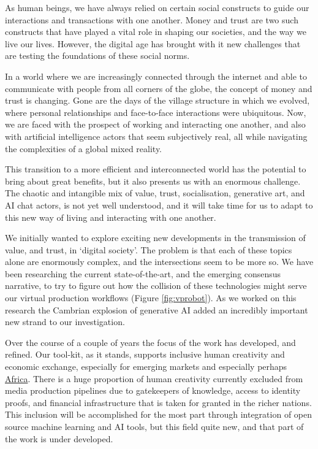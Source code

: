 As human beings, we have always relied on certain social constructs to guide our interactions and transactions with one another. Money and trust are two such constructs that have played a vital role in shaping our societies, and the way we live our lives. However, the digital age has brought with it new challenges that are testing the foundations of these social norms.\par
In a world where we are increasingly connected through the internet and able to communicate with people from all corners of the globe, the concept of money and trust is changing. Gone are the days of the village structure in which we evolved, where personal relationships and face-to-face interactions were ubiquitous. Now, we are faced with the prospect of working and interacting one another, and also with artificial intelligence actors that seem subjectively real, all while navigating the complexities of a global mixed reality.\par
This transition to a more efficient and interconnected world has the potential to bring about great benefits, but it also presents us with an enormous challenge. The chaotic and intangible mix of value, trust, socialisation, generative art, and AI chat actors, is not yet well understood, and it will take time for us to adapt to this new way of living and interacting with one another.\par
We initially wanted to explore exciting new developments in the transmission of value, and trust, in `digital society'. The problem is that each of these topics alone are enormously complex, and the intersections seem to be more so. We have been researching the current state-of-the-art, and the emerging consensus narrative, to try to figure out how the collision of these technologies might serve our virtual production workflows (Figure \ref{fig:vprobot}). As we worked on this research the Cambrian explosion of generative AI added an incredibly important new strand to our investigation.\par
Over the course of a couple of years the focus of the work has developed, and refined. Our tool-kit, as it stands, supports inclusive human creativity and economic exchange, especially for emerging markets and especially perhaps \href{https://www.afrobitcoin.org/}{Africa}. There is a huge proportion of human creativity currently excluded from media production pipelines due to gatekeepers of knowledge, access to identity proofs, and financial infrastructure that is taken for granted in the richer nations. This inclusion will be accomplished for the most part through integration of open source machine learning and AI tools, but this field quite new, and that part of the work is under developed.\par

